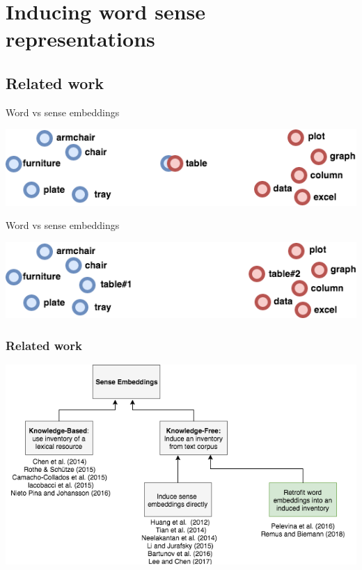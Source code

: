 
\section{Inducing word sense representations}


\subsection{Related work}

\begin{frame}{Word vs sense embeddings}

\begin{center}
	\includegraphics[width=1.0\textwidth]{table-ambigous}
\end{center}	
\end{frame}

\begin{frame}{Word vs sense embeddings}

\begin{center}
	\includegraphics[width=1.0\textwidth]{table-unambigous}
\end{center}	
\end{frame}


\begin{frame}[fragile]
\frametitle{Related work}
\begin{center}
 \includegraphics[height=0.56\textwidth]{GWC-1}
 \end{center}
\end{frame}



